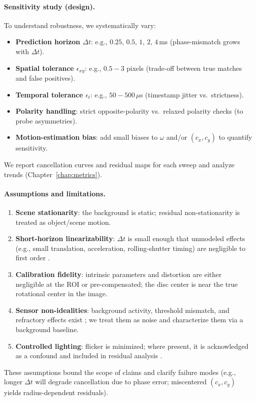 \paragraph{Sensitivity study (design).}
To understand robustness, we systematically vary:
\begin{itemize}
    \item \textbf{Prediction horizon $\Delta t$}: e.g., $0.25,\,0.5,\,1,\,2,\,4$\,ms (phase-mismatch grows with $\Delta t$).
    \item \textbf{Spatial tolerance $\epsilon_{xy}$}: e.g., $0.5\!-\!3$ pixels (trade-off between true matches and false positives).
    \item \textbf{Temporal tolerance $\epsilon_t$}: e.g., $50\!-\!500\,\mu$s (timestamp jitter vs.\ strictness).
    \item \textbf{Polarity handling}: strict opposite-polarity vs.\ relaxed polarity checks (to probe asymmetries).
    \item \textbf{Motion-estimation bias}: add small biases to $\omega$ and/or $(c_x,c_y)$ to quantify sensitivity.
\end{itemize}
We report cancellation curves and residual maps for each sweep and analyze trends (Chapter~\ref{chap:metrics}).

\paragraph{Assumptions and limitations.}
\begin{enumerate}
    \item \textbf{Scene stationarity}: the background is static; residual non-stationarity is treated as object/scene motion.
    \item \textbf{Short-horizon linearizability}: $\Delta t$ is small enough that unmodeled effects (e.g., small translation, acceleration, rolling-shutter timing) are negligible to first order \cite{Gallego2017Angular}.
    \item \textbf{Calibration fidelity}: intrinsic parameters and distortion are either negligible at the ROI or pre-compensated; the disc center is near the true rotational center in the image.
    \item \textbf{Sensor non-idealities}: background activity, threshold mismatch, and refractory effects exist \cite{Brandli2014DAVIS,Delbruck2020Handbook}; we treat them as noise and characterize them via a background baseline.
    \item \textbf{Controlled lighting}: flicker is minimized; where present, it is acknowledged as a confound and included in residual analysis \cite{Gallego2020Survey}.
\end{enumerate}
These assumptions bound the scope of claims and clarify failure modes (e.g., longer $\Delta t$ will degrade cancellation due to phase error; miscentered $(c_x,c_y)$ yields radius-dependent residuals).
\vspace{0.5em}

